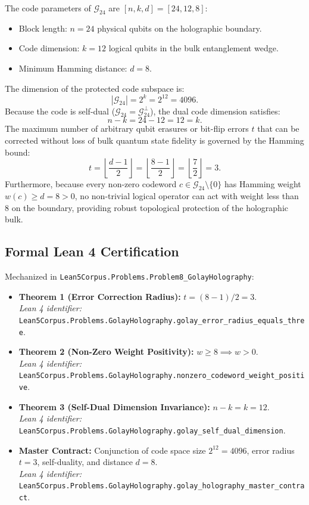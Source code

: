 \documentclass[11pt,a4paper]{article}
\begin{document}
The code parameters of $\mathcal{G}_{24}$ are $[n, k, d] = [24, 12, 8]$:
\begin{itemize}
    \item Block length: $n = 24$ physical qubits on the holographic boundary.
    \item Code dimension: $k = 12$ logical qubits in the bulk entanglement wedge.
    \item Minimum Hamming distance: $d = 8$.
\end{itemize}
The dimension of the protected code subspace is:
\begin{equation}
    |\mathcal{G}_{24}| = 2^k = 2^{12} = 4096.
\end{equation}
Because the code is self-dual ($\mathcal{G}_{24} = \mathcal{G}_{24}^\perp$), the dual code dimension satisfies:
\begin{equation}
    n - k = 24 - 12 = 12 = k.
\end{equation}
The maximum number of arbitrary qubit erasures or bit-flip errors $t$ that can be corrected without loss of bulk quantum state fidelity is governed by the Hamming bound:
\begin{equation}
    t = \left\lfloor \frac{d - 1}{2} \right\rfloor = \left\lfloor \frac{8 - 1}{2} \right\rfloor = \left\lfloor \frac{7}{2} \right\rfloor = 3.
\end{equation}
Furthermore, because every non-zero codeword $c \in \mathcal{G}_{24} \setminus \{0\}$ has Hamming weight $w(c) \ge d = 8 > 0$, no non-trivial logical operator can act with weight less than 8 on the boundary, providing robust topological protection of the holographic bulk.

\subsection{Formal Lean 4 Certification}
Mechanized in \texttt{Lean5Corpus.Problems.Problem8\_GolayHolography}:
\begin{itemize}
    \item \textbf{Theorem 1 (Error Correction Radius):} $t = (8 - 1) / 2 = 3$. \\
    \textit{Lean 4 identifier:} \texttt{Lean5Corpus.Problems.GolayHolography.golay\_error\_radius\_equals\_three}.
    \item \textbf{Theorem 2 (Non-Zero Weight Positivity):} $w \ge 8 \implies w > 0$. \\
    \textit{Lean 4 identifier:} \texttt{Lean5Corpus.Problems.GolayHolography.nonzero\_codeword\_weight\_positive}.
    \item \textbf{Theorem 3 (Self-Dual Dimension Invariance):} $n - k = k = 12$. \\
    \textit{Lean 4 identifier:} \texttt{Lean5Corpus.Problems.GolayHolography.golay\_self\_dual\_dimension}.
    \item \textbf{Master Contract:} Conjunction of code space size $2^{12}=4096$, error radius $t=3$, self-duality, and distance $d=8$. \\
    \textit{Lean 4 identifier:} \texttt{Lean5Corpus.Problems.GolayHolography.golay\_holography\_master\_contract}.
\end{itemize}
\end{document}
